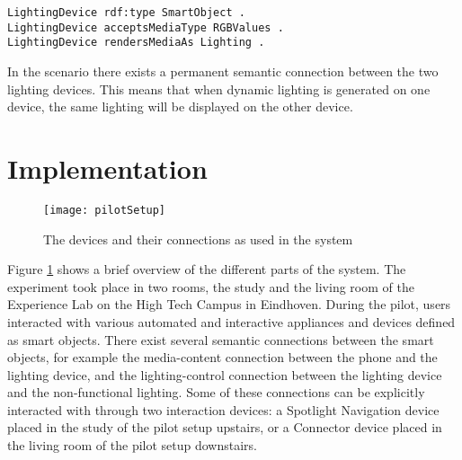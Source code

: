 \begin{verbatim}
LightingDevice rdf:type SmartObject .
LightingDevice acceptsMediaType RGBValues .
LightingDevice rendersMediaAs Lighting .
\end{verbatim}

In the scenario there exists a permanent semantic connection between the two lighting devices. This means that when dynamic lighting is generated on one device, the same lighting will be displayed on the other device.




\section{Implementation}
\label{D2Implementation}


\begin{figure}
\centerline{
\texttt{[image: pilotSetup]}}
\caption{The devices and their connections as used in the system}
\label{pilotSetup}
\end{figure}

Figure \ref{pilotSetup} shows a brief overview of the different parts of the system. The experiment took place in two rooms, the study and the living room of the Experience Lab on the High Tech Campus in Eindhoven. During the pilot, users interacted with various automated and interactive appliances and devices defined as smart objects. There exist several semantic connections between the smart objects, for example the media-content connection between the phone and the lighting device, and the lighting-control connection between the lighting device and the non-functional lighting. Some of these connections can be explicitly interacted with through two interaction devices: a Spotlight Navigation device placed in the study of the pilot setup upstairs, or a Connector device placed in the living room of the pilot setup downstairs. 

